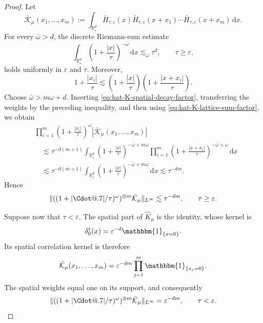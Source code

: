 \documentclass{article}
\makeatletter
\numberwithin{equation}{section}
\newcommand{\assign}{:=}
\newcommand{\mathd}{\mathrm{d}}
\newcommand*\Cdot{{\mathpalette\Cdot@{.7}}}
\newcommand*\Cdot@[2]{\mathbin{\vcenter{\hbox{\scalebox{#2}{\hspace{0.1mm}$\m@th#1\bullet$\hspace{0.1mm}}}}}}
\theoremstyle{plain}
\theoremstyle{definition}
\makeatother
\begin{document}
\begin{proof}
	Let
	\[
	\bar{\mathcal K}_\mu(x_1,\ldots,x_m)
	\assign
	\int_{\mathbb R_\varepsilon^d}
	\bar H_{\tau,\varepsilon}(x)
	\bar H_{\tau,\varepsilon}(x+x_1)\cdots
	\bar H_{\tau,\varepsilon}(x+x_m)
	\,\mathd x.
	\]
	For every \(\bar\omega>d\), the discrete Riemann-sum estimate
	\begin{equation}
		\label{eq:hat-K-lattice-sum-factor}
		\int_{\mathbb R_\varepsilon^d}
		\left(
		1+\frac{|x|}{\tau}
		\right)^{-\bar\omega}
		\,\mathd x
		\lesssim_{\bar\omega}
		\tau^d,
		\qquad
		\tau\geq\varepsilon,
	\end{equation}
	holds uniformly in \(\varepsilon\) and \(\tau\). Moreover,
	\[
	1+\frac{|x_i|}{\tau}
	\lesssim
	\left(
	1+\frac{|x|}{\tau}
	\right)
	\left(
	1+\frac{|x+x_i|}{\tau}
	\right).
	\]
	Choose \(\bar\omega>m\omega+d\). Inserting
	\eqref{eq:hat-K-spatial-decay-factor}, transferring the weights by
	the preceding inequality, and then using
	\eqref{eq:hat-K-lattice-sum-factor}, we obtain
	\begin{align*}
		&\prod_{i=1}^m
		\left(
		1+\frac{|x_i|}{\tau}
		\right)^\omega
		|
		\bar{\mathcal K}_\mu(x_1,\ldots,x_m)
		|
		\\
		&\quad\lesssim
		\tau^{-d(m+1)}
		\int_{\mathbb R_\varepsilon^d}
		\left(
		1+\frac{|x|}{\tau}
		\right)^{-\bar\omega+m\omega}
		\prod_{i=1}^m
		\left(
		1+\frac{|x+x_i|}{\tau}
		\right)^{-\bar\omega+\omega}
		\,\mathd x
		\\
		&\quad\lesssim
		\tau^{-d(m+1)}
		\int_{\mathbb R_\varepsilon^d}
		\left(
		1+\frac{|x|}{\tau}
		\right)^{-\bar\omega+m\omega}
		\,\mathd x
		\lesssim
		\tau^{-dm}.
	\end{align*}
	Hence
	\begin{equation}
		\label{eq:hat-K-spatial-correlation-above-factor}
		\|
		((1+|\Cdot|/\tau)^\omega)^{\otimes m}
		\bar{\mathcal K}_\mu
		\|_{L^\infty}
		\lesssim
		\tau^{-dm},
		\qquad
		\tau\geq\varepsilon.
	\end{equation}
	
	Suppose now that \(\tau<\varepsilon\). The spatial part of
	\(\hat K_\mu\) is the identity, whose kernel is
	\[
	\delta_0^\varepsilon(x)
	=
	\varepsilon^{-d}\mathbbm{1}_{\{x=0\}}.
	\]
	Its spatial correlation kernel is therefore
	\[
	\bar{\mathcal K}_\mu(x_1,\ldots,x_m)
	=
	\varepsilon^{-dm}
	\prod_{j=1}^m
	\mathbbm{1}_{\{x_j=0\}}.
	\]
	The spatial weights equal one on its support, and consequently
	\begin{equation}
		\label{eq:hat-K-spatial-correlation-below-factor}
		\|
		((1+|\Cdot|/\tau)^\omega)^{\otimes m}
		\bar{\mathcal K}_\mu
		\|_{L^\infty}
		=
		\varepsilon^{-dm},
		\qquad
		\tau<\varepsilon.
	\end{equation}
	

\end{proof}
\end{document}
